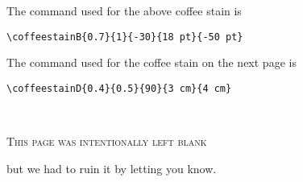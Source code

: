 \documentclass[a4paper, 11pt, BCOR = 0 pt, oneside, english]{scrartcl}
\begin{document}
\vfill{}

\begin{tcolorbox}
  The command used for the above coffee stain is

  \verb|\coffeestainB{0.7}{1}{-30}{18 pt}{-50 pt}|
\end{tcolorbox}

\begin{tcolorbox}
  The command used for the coffee stain on the next page is

  \verb|\coffeestainD{0.4}{0.5}{90}{3 cm}{4 cm}|
\end{tcolorbox}

\newpage{}
\pagestyle{empty}
~\\

\label{stainD}

\vfill{}
\begin{center}
\textsc{This page was intentionally left blank}

but we had to ruin it by letting you know.
\end{center}

\vfill{}
\end{document}
